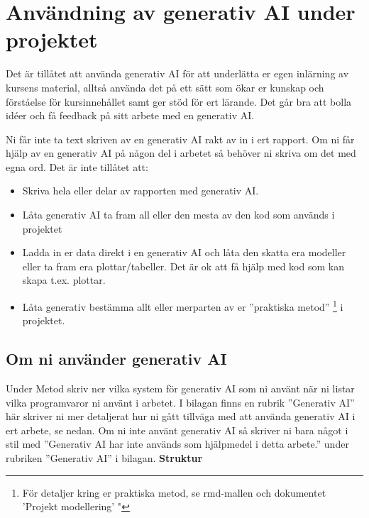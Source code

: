 \documentclass[a4paper]{article}
\begin{document}
\section{Användning av generativ AI under projektet} \label{sec:genAI}

Det är tillåtet att använda  generativ AI för att underlätta er egen inlärning av 
kursens material, alltså använda det på ett sätt som ökar er kunskap och förståelse
för kursinnehållet samt ger stöd för ert lärande. Det går bra att bolla idéer och 
få feedback på sitt arbete med en generativ AI. 

Ni får inte ta text skriven av en generativ AI rakt av in i ert rapport. Om ni får
hjälp av en generativ AI på någon del i arbetet så behöver ni skriva om det med egna ord.
\newline
\newline
Det är inte tillåtet att:
\begin{itemize}
  \item Skriva hela eller delar av rapporten med generativ AI.
  \item Låta generativ AI ta fram all eller den mesta av den kod som används i projektet
  \item Ladda in er data direkt i en generativ AI och låta den skatta era modeller eller 
  ta fram era plottar/tabeller. Det är ok att få hjälp med kod som kan skapa t.ex. plottar.
  \item Låta generativ bestämma allt eller merparten av er ”praktiska metod”
  \footnote{För detaljer kring er praktiska metod, se rmd-mallen och dokumentet 'Projekt modellering' "} i projektet.
\end{itemize}


\subsection*{Om ni använder generativ AI}

Under Metod skriv ner vilka system för  generativ AI som ni använt när ni listar vilka programvaror ni använt i arbetet.
\newline
\newline
I bilagan finns en rubrik ”Generativ AI” här skriver ni mer detaljerat hur ni gått tillväga med att använda generativ AI i ert arbete, se nedan.
\newline
\newline
Om ni inte använt generativ AI så skriver ni bara något i stil med ”Generativ AI har inte används som hjälpmedel i detta arbete.” under rubriken ”Generativ AI” i bilagan.
\newline
\newline
\textbf{Struktur}
\end{document}
